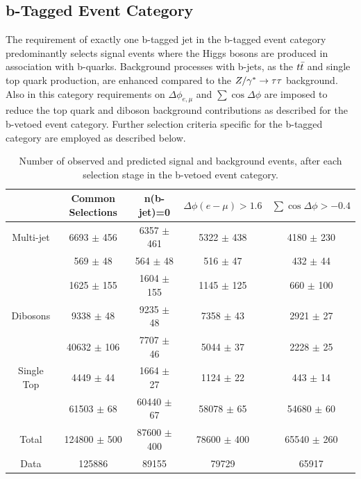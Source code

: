 \subsection{b-Tagged Event Category}\label{sec:tag}
The requirement of exactly one b-tagged jet in the b-tagged event category predominantly selects signal events 
where the Higgs bosons are produced in  association with b-quarks.
Background processes with b-jets, as the $t\bar{t}$ and single top quark production, are enhanced compared to the $Z/\gamma^*\rightarrow \tau\tau$ background.
Also in this category requirements on $\Delta\phi_{e,\mu}$ and $\sum\cos\Delta\phi$  are imposed to reduce the top quark and diboson background contributions
as described for the b-vetoed event category. Further selection criteria specific for the b-tagged category
are employed  as described below.

\begin{table}[!t]
  \caption{Number of observed and predicted signal and background events, after each selection stage in the b-vetoed event category.}
	\vspace{1mm}
  \centering
   \begin{footnotesize}	
  \begin{tabular}{ccccc}
    \hline\hline
	&	Common Selections			&	n(b-jet)=0	&	$\Delta\phi(e-\mu)>1.6$	&	$\sum\cos\Delta\phi > -0.4$ 		\\	
    \hline
Multi-jet	&	6693	$\pm$	456	&	6357	$\pm$	461	&	5322	$\pm$	438	&	4180	$\pm$	230	\\
\Zll 		&	569	$\pm$	48	&	564	$\pm$	48	&	516	$\pm$	47	&	432	$\pm$	44		\\
\Wlnu		&	1625	$\pm$	155	&	1604	$\pm$	155	&	1145	$\pm$	125	&	660	$\pm$	100		\\
Dibosons	&	9338	$\pm$	48	&	9235	$\pm$	48	&	7358	$\pm$	43	&	2921	$\pm$	27		\\
\ttbar		&	40632	$\pm$	106	&	7707	$\pm$	46	&	5044	$\pm$	37	&	2228	$\pm$	25		\\
Single Top	&	4449	$\pm$	44	&	1664	$\pm$	27	&	1124	$\pm$	22	&	443	$\pm$	14	\\
\Ztautau	&	61503	$\pm$	68	&	60440	$\pm$	67	&	58078	$\pm$	65	&	54680	$\pm$	60	\\
    \hline
Total		&	124800 $\pm$ 	500	& 	87600 $\pm$ 400		&	78600 $\pm$	400	&	65540 $\pm$	260 \\
\hline
Data	&	125886			&	89155			&	79729			&	65917		\\
   \hline
   \hline
  \end{tabular}
  \label{tab:eventsel:bveto}
   \end{footnotesize}	
\end{table}

